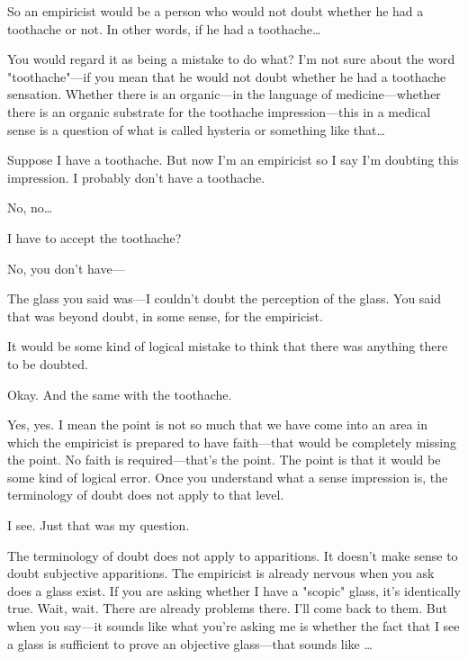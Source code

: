  So an empiricist would be a person who would not doubt 
whether he had a toothache or not. In other words, if he had a 
toothache\ldots

 You would regard it as being a mistake to do what? I'm not 
sure about the word "toothache"---if you mean that he would not 
doubt whether he had a toothache sensation. Whether there is an 
organic---in the language of medicine---whether there is an organic 
substrate for the toothache impression---this in a medical sense is a 
question of what is called hysteria or something like that\ldots

 Suppose I have a toothache. But now I'm an empiricist so I 
say I'm doubting this impression. I probably don't have a toothache. 

 No, no\ldots

 I have to accept the toothache? 

 No, you don't have--- 

 The glass you said was---I couldn't doubt the perception of 
the glass. You said that was beyond doubt, in some sense, for the 
empiricist. 

 It would be some kind of logical mistake to think that there 
was anything there to be doubted. 

 Okay. And the same with the toothache. 

 Yes, yes. I mean the point is not so much that we have come 
into an area in which the empiricist is prepared to have faith---that 
would be completely missing the point. No faith is required---that's the 
point. The point is that it would be some kind of logical error. Once you 
understand what a sense impression is, the terminology of doubt does 
not apply to that level. 

 I see. Just that was my question. 

 The terminology of doubt does not apply to apparitions. It 
doesn't make sense to doubt subjective apparitions. The empiricist is 
already nervous when you ask does a glass exist. If you are asking 
whether I have a "scopic" glass, it's identically true. Wait, wait. There 
are already problems there. I'll come back to them. But when you 
say---it sounds like what you're asking me is whether the fact that I see a 
glass is sufficient to prove an objective glass---that sounds like \ldots

